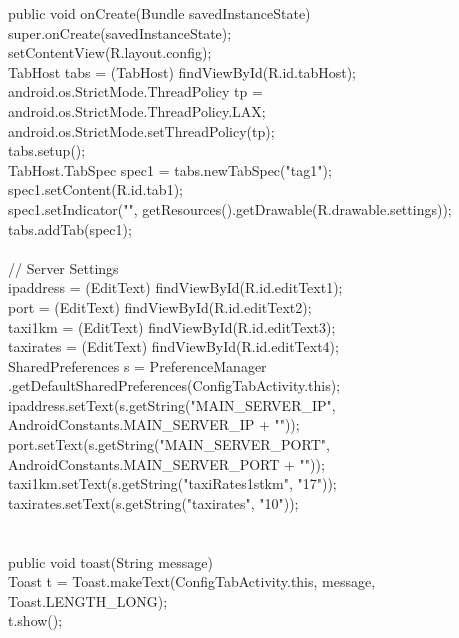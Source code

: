 \documentclass[12pt,a4paper]{article}
\begin{document}
\hspace{0.7 cm}public void onCreate(Bundle savedInstanceState) {\\
		super.onCreate(savedInstanceState);\\
		setContentView(R.layout.config);\\
		TabHost tabs = (TabHost) findViewById(R.id.tabHost);\\
		android.os.StrictMode.ThreadPolicy tp = android.os.StrictMode.ThreadPolicy.LAX;\\
		android.os.StrictMode.setThreadPolicy(tp);\\
		tabs.setup();\\

		TabHost.TabSpec spec1 = tabs.newTabSpec("tag1");\\

		spec1.setContent(R.id.tab1);\\

		spec1.setIndicator("", getResources().getDrawable(R.drawable.settings));\\

		tabs.addTab(spec1);\\
\\
		// Server Settings\\
		ipaddress = (EditText) findViewById(R.id.editText1);\\
		port = (EditText) findViewById(R.id.editText2);\\
		taxi1km = (EditText) findViewById(R.id.editText3);\\
		taxirates = (EditText) findViewById(R.id.editText4);\\
		SharedPreferences s = PreferenceManager
				.getDefaultSharedPreferences(ConfigTabActivity.this);\\
		ipaddress.setText(s.getString("MAIN_SERVER_IP",
				AndroidConstants.MAIN_SERVER_IP + ""));\\
		port.setText(s.getString("MAIN_SERVER_PORT",
				AndroidConstants.MAIN_SERVER_PORT + ""));\\
		taxi1km.setText(s.getString("taxiRates1stkm", "17"));\\
		taxirates.setText(s.getString("taxirates", "10"));\\
	}\\
\\
	public void toast(String message) {\\
		Toast t = Toast.makeText(ConfigTabActivity.this, message,
				Toast.LENGTH_LONG);\\
		t.show();\\
	}\\
\end{document}
